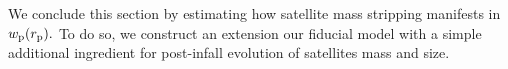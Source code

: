 \documentclass[usenatbib,usegraphicx,letterpaper]{mn2e}
\newcommand{\rhalf}{R_{1/2}}
\newcommand{\mvir}{M_{\rm vir}}
\newcommand{\macc}{M_{\rm acc}}
\newcommand{\rvir}{R_{\rm vir}}
\newcommand{\rproj}{r_{\rm p}}
\newcommand{\wproj}{w_{\rm p}}
\begin{document}



We conclude this section by estimating how satellite mass stripping manifests in $\wproj(\rproj).$ To do so, we construct an extension our fiducial model with a simple additional ingredient for post-infall evolution of satellites mass and size. 


\end{document}
